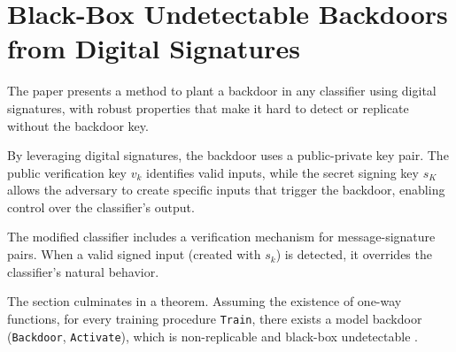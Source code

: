 \documentclass[
	fontsize=12pt,
	headings=small,
	parskip=quarter,
	bibliography=totoc,
	numbers=noenddot,       
	open=any,               
 	final                   
]{scrreprt}
\begin{document}
\section{Black-Box Undetectable Backdoors from Digital Signatures}
The paper presents a method to plant a backdoor in any classifier using digital signatures, with robust properties that make it hard to detect or replicate without the backdoor key.
\par By leveraging digital signatures, the backdoor uses a public-private key pair. The public verification key $v_k$ identifies valid inputs, while the secret signing key $s_K$ allows the adversary to create specific inputs that trigger the backdoor, enabling control over the classifier’s output.
\par The modified classifier includes a verification mechanism for message-signature pairs. When a valid signed input (created with $s_k$) is detected, it overrides the classifier’s natural behavior.
\par The section culminates in a theorem. Assuming the existence of one-way functions, for every training procedure \texttt{Train}, there exists a model backdoor (\texttt{Backdoor}, \texttt{Activate}), which is non-replicable and black-box undetectable \cite{goldwasser2022backdoors}.
\end{document}

